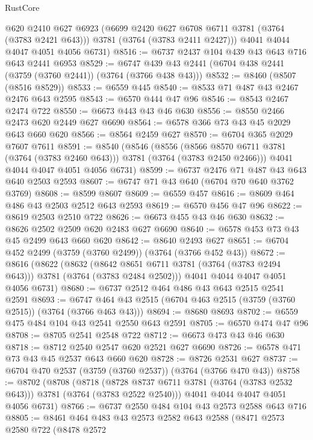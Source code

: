 \begin{lexlean}{RustCore}
\begin{coremodule}
        @620
        @2410
        @627
        @6923
        (@6699 @2420 @627 @6708 @6711 @3781 (@3764 (@3783 @2421 @643)))
        @3781
        (@3764 (@3783 @2411 @2427)))
      @4041
      @4044
      @4047
      @4051
      @4056
      @6731)
@8516 := @6737 @2437 @104 @439 @43 @643 @716 @643 @2441 @6953
@8529 := @6747 @439 @43 @2441 (@6704 @438 @2441 (@3759 (@3760 @2441)) (@3764 (@3766 @438 @43)))
@8532 := @8460 (@8507 (@8516 @8529))
@8533 := @6559 @445
@8540 := @8533 @71 @487 @43 @2467 @2476 @643 @2595
@8543 := @6570 @444 @47 @96
@8546 := @8543 @2467 @2474 @722
@8550 := @6673 @443 @43 @46 @630
@8556 := @8550 @2466 @2473 @620 @2449 @627 @6690
@8564 := @6578 @366 @73 @43 @45 @2029 @643 @660 @620
@8566 := @8564 @2459 @627
@8570 := @6704 @365 @2029 @7607 @7611
@8591 := @8540
    (@8546
      (@8556 (@8566 @8570 @6711 @3781 (@3764 (@3783 @2460 @643))) @3781 (@3764 (@3783 @2450 @2466)))
      @4041
      @4044
      @4047
      @4051
      @4056
      @6731)
@8599 := @6737 @2476 @71 @487 @43 @643 @640 @2503 @2593
@8607 := @6747 @71 @43 @640 (@6704 @70 @640 @3762 @3769)
@8608 := @8599 @8607
@8609 := @6559 @457
@8616 := @8609 @464 @486 @43 @2503 @2512 @643 @2593
@8619 := @6570 @456 @47 @96
@8622 := @8619 @2503 @2510 @722
@8626 := @6673 @455 @43 @46 @630
@8632 := @8626 @2502 @2509 @620 @2483 @627 @6690
@8640 := @6578 @453 @73 @43 @45 @2499 @643 @660 @620
@8642 := @8640 @2493 @627
@8651 := @6704 @452 @2499 (@3759 (@3760 @2499)) (@3764 (@3766 @452 @43))
@8672 := @8616
    (@8622
      (@8632 (@8642 @8651 @6711 @3781 (@3764 (@3783 @2494 @643))) @3781 (@3764 (@3783 @2484 @2502)))
      @4041
      @4044
      @4047
      @4051
      @4056
      @6731)
@8680 := @6737 @2512 @464 @486 @43 @643 @2515 @2541 @2591
@8693 := @6747 @464 @43 @2515 (@6704 @463 @2515 (@3759 (@3760 @2515)) (@3764 (@3766 @463 @43)))
@8694 := @8680 @8693
@8702 := @6559 @475 @484 @104 @43 @2541 @2550 @643 @2591
@8705 := @6570 @474 @47 @96
@8708 := @8705 @2541 @2548 @722
@8712 := @6673 @473 @43 @46 @630
@8718 := @8712 @2540 @2547 @620 @2521 @627 @6690
@8726 := @6578 @471 @73 @43 @45 @2537 @643 @660 @620
@8728 := @8726 @2531 @627
@8737 := @6704 @470 @2537 (@3759 (@3760 @2537)) (@3764 (@3766 @470 @43))
@8758 := @8702
    (@8708
      (@8718 (@8728 @8737 @6711 @3781 (@3764 (@3783 @2532 @643))) @3781 (@3764 (@3783 @2522 @2540)))
      @4041
      @4044
      @4047
      @4051
      @4056
      @6731)
@8766 := @6737 @2550 @484 @104 @43 @2573 @2588 @643 @716
@8805 := @8461
    @464
    @483
    @43
    @2573
    @2582
    @643
    @2588
    (@8471
      @2573
      @2580
      @722
      (@8478
        @2572

\end{coremodule}
\end{lexlean}

